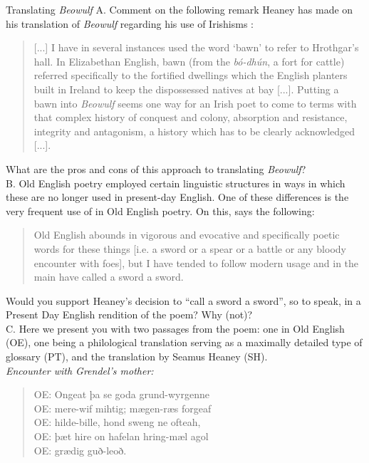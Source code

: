 \begin{exercises}{Translating \textit{Beowulf}}
\chili{}
A. Comment on the following remark Heaney has made on his translation of \textit{Beowulf} regarding his use of Irishisms \citep[xxxiv]{Heaney2000}:

\begin{quote}
    [...] I have in several instances used the word `bawn' to refer to Hrothgar's hall. In Elizabethan English, bawn (from the  \textit{bó-dhún}, a fort for cattle) referred specifically to the fortified dwellings which the English planters built in Ireland to keep the dispossessed natives at bay [...]. Putting a bawn into \textit{Beowulf} seems one way for an Irish poet to come to terms with that complex history of conquest and colony, absorption and resistance, integrity and antagonism, a history which has to be clearly acknowledged [...].
\end{quote}

\noindent What are the pros and cons of this approach to translating \textit{Beowulf}?\\

\noindent B. Old English poetry employed certain linguistic structures in ways in which these are no longer used in present-day English. One of these differences is the very frequent use of  in Old English poetry. On this, \citet[xxxiii]{Heaney2000} says the following:

\begin{quote}
Old English abounds in vigorous and evocative and specifically poetic words for these things [i.e. a sword or a spear or a battle or any bloody encounter with foes], but I have tended to follow modern usage and in the main have called a sword a sword.
\end{quote}

\noindent Would you support Heaney's decision to ``call a sword a sword'', so to speak, in a Present Day English rendition of the poem? Why (not)?\\

\noindent C. Here we present you with two passages from the poem: one in Old English (OE), one being a philological translation serving as a maximally detailed type of glossary (PT), and the translation by Seamus Heaney (SH).\\


\emph{Encounter with Grendel's mother:}
\begin{quote}
OE: Ongeat þa se goda grund-wyrgenne\\
OE: mere-wif mihtig; mægen-ræs forgeaf\\
OE: hilde-bille, hond sweng ne ofteah,\\
OE: þæt hire on hafelan hring-mæl agol\\
OE: grædig guð-leoð.\\
\citep[104]{Heaney2000}
\end{quote}


\end{exercises}
